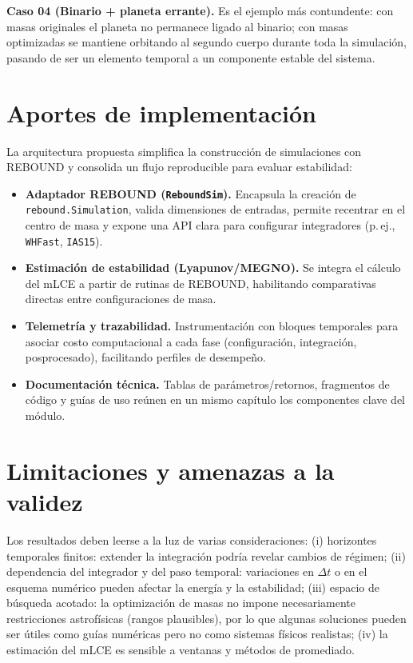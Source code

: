 \textbf{Caso 04 (Binario + planeta errante).} Es el ejemplo más contundente: con masas originales el planeta no permanece ligado al binario; con masas optimizadas se mantiene orbitando al segundo cuerpo durante toda la simulación, pasando de ser un elemento temporal a un componente estable del sistema.

\section{Aportes de implementación}
La arquitectura propuesta simplifica la construcción de simulaciones con REBOUND y consolida un flujo reproducible para evaluar estabilidad:
\begin{itemize}
  \item \textbf{Adaptador REBOUND (\texttt{ReboundSim}).} Encapsula la creación de \texttt{rebound.Simulation}, valida dimensiones de entradas, permite recentrar en el centro de masa y expone una API clara para configurar integradores (p.\,ej., \texttt{WHFast}, \texttt{IAS15}).
  \item \textbf{Estimación de estabilidad (Lyapunov/MEGNO).} Se integra el cálculo del mLCE a partir de rutinas de REBOUND, habilitando comparativas directas entre configuraciones de masa.
  \item \textbf{Telemetría y trazabilidad.} Instrumentación con bloques temporales para asociar costo computacional a cada fase (configuración, integración, posprocesado), facilitando perfiles de desempeño.
  \item \textbf{Documentación técnica.} Tablas de parámetros/retornos, fragmentos de código y guías de uso reúnen en un mismo capítulo los componentes clave del módulo.
\end{itemize}

\section{Limitaciones y amenazas a la validez}
Los resultados deben leerse a la luz de varias consideraciones: (i) horizontes temporales finitos: extender la integración podría revelar cambios de régimen; (ii) dependencia del integrador y del paso temporal: variaciones en \(\Delta t\) o en el esquema numérico pueden afectar la energía y la estabilidad; (iii) espacio de búsqueda acotado: la optimización de masas no impone necesariamente restricciones astrofísicas (rangos plausibles), por lo que algunas soluciones pueden ser útiles como guías numéricas pero no como sistemas físicos realistas; (iv) la estimación del mLCE es sensible a ventanas y métodos de promediado.

